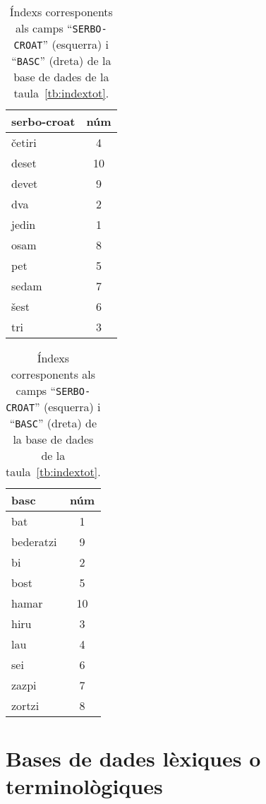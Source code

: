 \begin{table}
 \begin{center}
 \parbox{0.25\textwidth}{
 \begin{tabular}{lc}
 \hline
 {\sc serbo-croat} & {\sc núm} \\
 \hline
 \hline
 \v{c}etiri &     4 \\
 deset &      10 \\
 devet &      9 \\
 dva &        2 \\
 jedin &      1 \\
 osam &       8 \\
 pet &        5 \\
 sedam &      7 \\
 \v{s}est &       6 \\
 tri &        3 \\
 \hline
 \end{tabular}}%
\hspace{0.2\textwidth}%
\parbox{0.25\textwidth}{
   \begin{tabular}{lc}
   \hline
   {\sc basc\phantom{o-croat}} & {\sc núm} \\
   \hline
   \hline
  bat &       1 \\
  bederatzi  & 9 \\  
  bi &        2 \\   
  bost &      5 \\   
  hamar &     10 \\   
  hiru &       3 \\   
  lau &       4 \\   
  sei &        6 \\    
  zazpi &      7 \\ 
  zortzi &    8 \\
   \hline
   \end{tabular}}%
  \end{center}
  \caption{Índexs corresponents 
    als camps ``\texttt{SERBO-CROAT}'' (esquerra) i 
    ``\texttt{BASC}'' (dreta) de la base de dades de la
    taula~\ref{tb:indextot}.}
   \label{tb:indexbasc}
\end{table}




\section{Bases de dades lèxiques o terminològiques}
\label{ss:bdterm}

